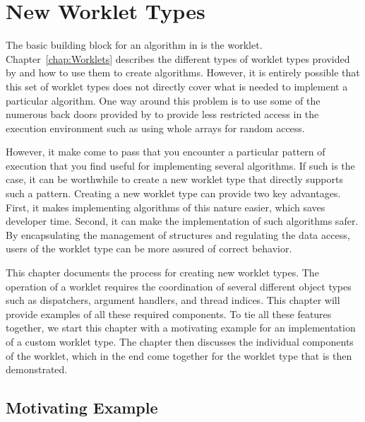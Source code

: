 
\chapter{New Worklet Types}
\label{chap:NewWorkletTypes}


The basic building block for an algorithm in \VTKm is the worklet.
Chapter~\ref{chap:Worklets} describes the different types of worklet types provided by \VTKm and how to use them to create algorithms.
However, it is entirely possible that this set of worklet types does not directly cover what is needed to implement a particular algorithm.
One way around this problem is to use some of the numerous back doors provided by \VTKm to provide less restricted access in the execution environment such as using whole arrays for random access.

However, it make come to pass that you encounter a particular pattern of execution that you find useful for implementing several algorithms.
If such is the case, it can be worthwhile to create a new worklet type that directly supports such a pattern.
Creating a new worklet type can provide two key advantages.
First, it makes implementing algorithms of this nature easier, which saves developer time.
Second, it can make the implementation of such algorithms safer.
By encapsulating the management of structures and regulating the data access, users of the worklet type can be more assured of correct behavior.

This chapter documents the process for creating new worklet types.
The operation of a worklet requires the coordination of several different object types such as dispatchers, argument handlers, and thread indices.
This chapter will provide examples of all these required components.
To tie all these features together, we start this chapter with a motivating example for an implementation of a custom worklet type.
The chapter then discusses the individual components of the worklet, which in the end come together for the worklet type that is then demonstrated.

\section{Motivating Example}
\label{sec:NewWorkletTypes:MotivatingExample}



